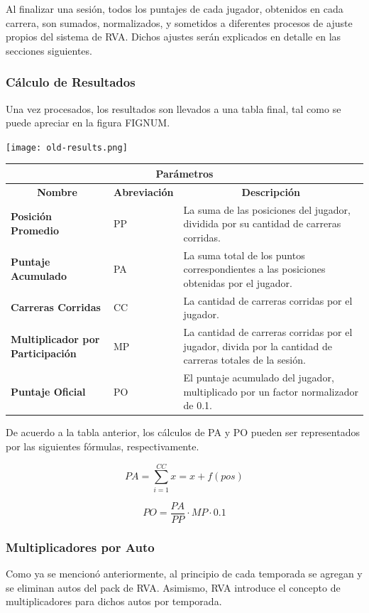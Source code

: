 Al finalizar una sesión, todos los puntajes de cada jugador, obtenidos en cada carrera, son sumados, normalizados, y sometidos a diferentes procesos de ajuste propios del sistema de RVA. Dichos ajustes serán explicados en detalle en las secciones siguientes.


\subsubsection{Cálculo de Resultados}
Una vez procesados, los resultados son llevados a una tabla final, tal como se puede apreciar en la figura FIGNUM.

\texttt{[image: old-results.png]}

\begin{center}
	\begin{tabular}{ | p{5cm} | l | p{8cm} |}
		\hline
		\multicolumn{3}{|c|}{\textbf{Parámetros}} \\
		\hline
		\multicolumn{1}{|c|}{\textbf{Nombre}} & \multicolumn{1}{|c|}{\textbf{Abreviación}} & \multicolumn{1}{|c|}{\textbf{Descripción}} \\
		\hline
		{\textbf{Posición Promedio}} & PP & La suma de las posiciones del jugador, dividida por su cantidad de carreras corridas. \\ \hline
		{\textbf{Puntaje Acumulado}} & PA & La suma total de los puntos correspondientes a las posiciones obtenidas por el jugador. \\ \hline
		{\textbf{Carreras Corridas}} & CC & La cantidad de carreras corridas por el jugador. \\ \hline
		{\textbf{Multiplicador por Participación}} & MP & La cantidad de carreras corridas por el jugador, divida por la cantidad de carreras totales de la sesión. \\ \hline
		{\textbf{Puntaje Oficial}} & PO & El puntaje acumulado del jugador, multiplicado por un factor normalizador de 0.1. \\ \hline
	\end{tabular}
\end{center}

De acuerdo a la tabla anterior, los cálculos de PA y PO pueden ser representados por las siguientes fórmulas, respectivamente.

\[
{PA} = \sum_{i=1}^{CC}x=x+f(pos) 
\]

\[
{PO} = \frac{PA}{PP} \cdot MP \cdot 0.1
\]


\subsubsection{Multiplicadores por Auto}
Como ya se mencionó anteriormente, al principio de cada temporada se agregan y se eliminan autos del pack de RVA. Asimismo, RVA introduce el concepto de multiplicadores para dichos autos por temporada.

